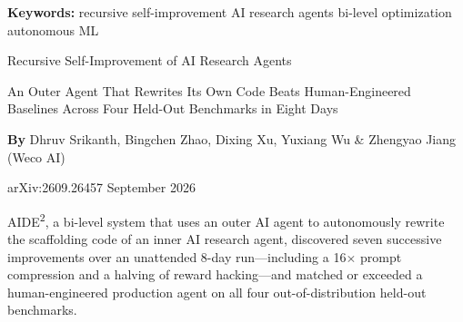 \documentclass[10pt,twocolumn]{article}
\begin{document}
\setlength{\parindent}{0pt}
\setlength{\parskip}{4pt}

{\small\color{keywordgray}\textbf{Keywords:}
  recursive self-improvement \textbullet{}
  AI research agents \textbullet{}
  bi-level optimization \textbullet{}
  autonomous ML}\par\vspace{4pt}

{\LARGE\bfseries\raggedright
  Recursive Self-Improvement of AI Research Agents}\par\vspace{4pt}

{\large\itshape\raggedright
  An Outer Agent That Rewrites Its Own Code Beats Human-Engineered
  Baselines Across Four Held-Out Benchmarks in Eight Days}\par\vspace{6pt}

{\small\textbf{By} Dhruv Srikanth, Bingchen Zhao, Dixing Xu, Yuxiang Wu
  \& Zhengyao Jiang (Weco AI)}\par\vspace{2pt}

{\small\color{keywordgray}arXiv:2609.26457 \textbullet{} September 2026}
\par\vspace{2pt}\noindent{\color{rulered}\rule{\columnwidth}{0.6pt}}\vspace{6pt}

AIDE\textsuperscript{2}, a bi-level system that uses an outer AI agent to
autonomously rewrite the scaffolding code of an inner AI research agent,
discovered seven successive improvements over an unattended 8-day run---including
a 16$\times$ prompt compression and a halving of reward hacking---and matched
or exceeded a human-engineered production agent on all four out-of-distribution
held-out benchmarks.
\end{document}
